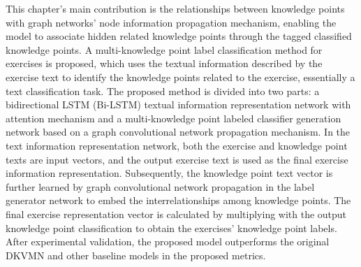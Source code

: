 
This chapter's main contribution is the relationships between knowledge points with graph networks' node information propagation mechanism, enabling the model to associate hidden related knowledge points through the tagged classified knowledge points. A multi-knowledge point label classification method for exercises is proposed, which uses the textual information described by the exercise text to identify the knowledge points related to the exercise, essentially a text classification task. The proposed method is divided into two parts: a bidirectional LSTM (Bi-LSTM) textual information representation network with attention mechanism and a multi-knowledge point labeled classifier generation network based on a graph convolutional network propagation mechanism. In the text information representation network, both the exercise and knowledge point texts are input vectors, and the output exercise text is used as the final exercise information representation. Subsequently, the knowledge point text vector is further learned by graph convolutional network propagation in the label generator network to embed the interrelationships among knowledge points. The final exercise representation vector is calculated by multiplying with the output knowledge point classification to obtain the exercises' knowledge point labels. After experimental validation, the proposed model outperforms the original DKVMN and other baseline models in the proposed metrics.




